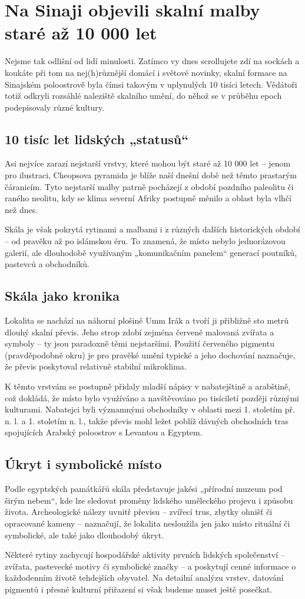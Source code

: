 \documentclass[main.tex]{subfiles}
\begin{document}
\section{Na Sinaji objevili skalní malby staré až 10 000 let}
Nejsme tak odlišní od lidí minulosti. Zatímco vy dnes scrollujete zdí na sockách a koukáte při tom na nej(h)různější domácí i světové novinky, skalní formace na Sinajském poloostrově byla čímsi takovým v uplynulých 10 tisíci letech. Vědátoři totiž odkryli rozsáhlé naleziště skalního umění, do něhož se v průběhu epoch podepisovaly různé kultury.
\subsection*{10 tisíc let lidských „statusů“}
Asi nejvíce zarazí nejstarší vrstvy, které mohou být staré až 10 000 let – jenom pro ilustraci, Cheopsova pyramida je blíže naší dnešní době než těmto prastarým čáranicím. Tyto nejstarší malby patrně pocházejí z období pozdního paleolitu či raného neolitu, kdy se klima severní Afriky postupně měnilo a oblast byla vlhčí než dnes.\par
Skála je však pokrytá rytinami a malbami i z různých dalších historických období – od pravěku až po islámskou éru. To znamená, že místo nebylo jednorázovou galerií, ale dlouhodobě využívaným „komunikačním panelem“ generací poutníků, pastevců a obchodníků.
\subsection*{Skála jako kronika}
Lokalita se nachází na náhorní plošině Umm Irák a tvoří ji přibližně sto metrů dlouhý skalní převis. Jeho strop zdobí zejména červeně malovaná zvířata a symboly – ty jsou paradoxně těmi nejstaršími. Použití červeného pigmentu (pravděpodobně okru) je pro pravěké umění typické a jeho dochování naznačuje, že převis poskytoval relativně stabilní mikroklima.\par
K těmto vrstvám se postupně přidaly mladší nápisy v nabatejštině a arabštině, což dokládá, že místo bylo využíváno a navštěvováno po tisíciletí později různými kulturami. Nabatejci byli významnými obchodníky v oblasti mezi 1. stoletím př. n. l. a 1. stoletím n. l., takže převis mohl ležet poblíž dávných obchodních tras spojujících Arabský poloostrov s Levantou a Egyptem.
\subsection*{Úkryt i symbolické místo}
Podle egyptských památkářů skála představuje jakési „přírodní muzeum pod širým nebem“, kde lze sledovat proměny lidského uměleckého projevu i způsobu života. Archeologické nálezy uvnitř převisu – zvířecí trus, zbytky ohnišť či opracované kameny – naznačují, že lokalita nesloužila jen jako místo rituální či symbolické, ale také jako dlouhodobý úkryt.\par
Některé rytiny zachycují hospodářské aktivity prvních lidských společenství – zvířata, pastevecké motivy či symbolické značky – a poskytují cenné informace o každodenním životě tehdejších obyvatel. Na detailní analýzu vrstev, datování pigmentů i přesné kulturní přiřazení si však budeme muset ještě posečkat.
\end{document}
